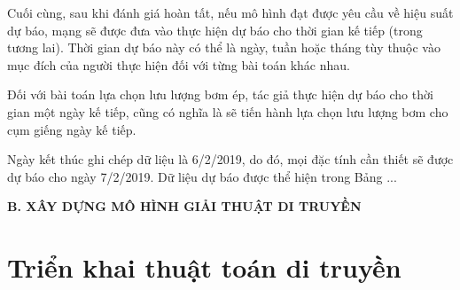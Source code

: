 \documentclass[12pt,a4paper]{report}
\begin{document}
Cuối cùng, sau khi đánh giá hoàn tất, nếu mô hình đạt được yêu cầu về hiệu suất dự báo, mạng sẽ được đưa vào thực hiện dự báo cho thời gian kế tiếp (trong tương lai). Thời gian dự báo này có thể là ngày, tuần hoặc tháng tùy thuộc vào mục đích của người thực hiện đối với từng bài toán khác nhau.

Đối với bài toán lựa chọn lưu lượng bơm ép, tác giả thực hiện dự báo cho thời gian một ngày kế tiếp, cũng có nghĩa là sẽ tiến hành lựa chọn lưu lượng bơm cho cụm giếng ngày kế tiếp.

Ngày kết thúc ghi chép dữ liệu là 6/2/2019, do đó, mọi đặc tính cần thiết sẽ được dự báo cho ngày 7/2/2019. Dữ liệu dự báo được thể hiện trong Bảng ...

\begin{center}
	\centering
	\textbf{B. XÂY DỰNG MÔ HÌNH GIẢI THUẬT DI TRUYỀN}
\end{center}
\section{Triển khai thuật toán di truyền}
\end{document}
